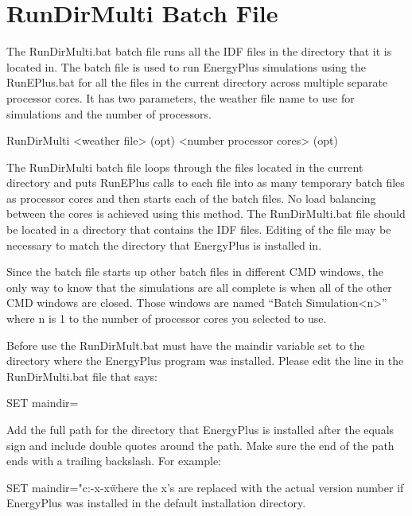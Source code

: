 \section{RunDirMulti Batch File}\label{rundirmulti-batch-file}

The RunDirMulti.bat batch file runs all the IDF files in the directory that it is located in. The batch file is used to run EnergyPlus simulations using the RunEPlus.bat for all the files in the current directory across multiple separate processor cores. It has two parameters, the weather file name to use for simulations and the number of processors.

RunDirMulti \textless{}weather file\textgreater{} (opt) \textless{}number processor cores\textgreater{} (opt)

The RunDirMulti batch file loops through the files located in the current directory and puts RunEPlus calls to each file into as many temporary batch files as processor cores and then starts each of the batch files. No load balancing between the cores is achieved using this method. The RunDirMulti.bat file should be located in a directory that contains the IDF files. Editing of the file may be necessary to match the directory that EnergyPlus is installed in.

Since the batch file starts up other batch files in different CMD windows, the only way to know that the simulations are all complete is when all of the other CMD windows are closed. Those windows are named ``Batch Simulation\textless{}n\textgreater{}'' where n is 1 to the number of processor cores you selected to use.

Before use the RunDirMult.bat must have the maindir variable set to the directory where the EnergyPlus program was installed. Please edit the line in the RunDirMulti.bat file that says:

SET maindir=

Add the full path for the directory that EnergyPlus is installed after the equals sign and include double quotes around the path. Make sure the end of the path ends with a trailing backslash. For example:

SET maindir="c:\EnergyPlusVx-x-x\"

where the x's are replaced with the actual version number if EnergyPlus was installed in the default installation directory.
